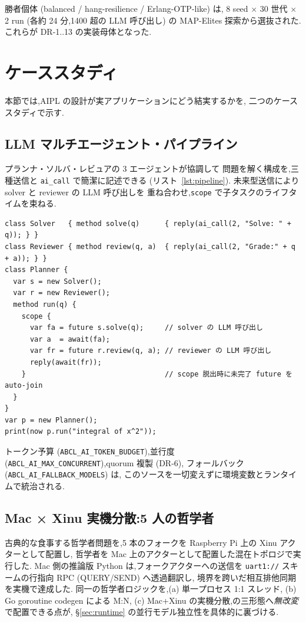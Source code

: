 \documentclass[11pt,a4paper]{article}
\newcommand{\code}[1]{\texttt{\small #1}}
\begin{document}
勝者個体 (balanced / hang-resilience / Erlang-OTP-like) は,
8 seed × 30 世代 × 2 run (各約 24 分,1400 超の LLM 呼び出し) の
MAP-Elites 探索から選抜された.
これらが DR-1..13 の実装母体となった.

\section{ケーススタディ}\label{sec:case}
本節では,AIPL の設計が実アプリケーションにどう結実するかを,
二つのケーススタディで示す.

\subsection{LLM マルチエージェント・パイプライン}
プランナ・ソルバ・レビュアの 3 エージェントが協調して
問題を解く構成を,三種送信と \code{ai\_call} で簡潔に記述できる
(リスト~\ref{lst:pipeline}).
未来型送信により solver と reviewer の LLM 呼び出しを
重ね合わせ,\code{scope} で子タスクのライフタイムを束ねる.

\begin{lstlisting}[caption={planner→solver→reviewer の協調},label={lst:pipeline},float=h]
class Solver   { method solve(q)      { reply(ai_call(2, "Solve: " + q)); } }
class Reviewer { method review(q, a)  { reply(ai_call(2, "Grade:" + q + a)); } }
class Planner {
  var s = new Solver();
  var r = new Reviewer();
  method run(q) {
    scope {
      var fa = future s.solve(q);     // solver の LLM 呼び出し
      var a  = await(fa);
      var fr = future r.review(q, a); // reviewer の LLM 呼び出し
      reply(await(fr));
    }                                 // scope 脱出時に未完了 future を auto-join
  }
}
var p = new Planner();
print(now p.run("integral of x^2"));
\end{lstlisting}

トークン予算 (\code{ABCL\_AI\_TOKEN\_BUDGET}),並行度
(\code{ABCL\_AI\_MAX\_CONCURRENT}),quorum 複製 (DR-6),
フォールバック (\code{ABCL\_AI\_FALLBACK\_MODELS}) は,
このソースを一切変えずに環境変数とランタイムで統治される.

\subsection{Mac × Xinu 実機分散:5 人の哲学者}
古典的な食事する哲学者問題を,5 本のフォークを
Raspberry Pi 上の Xinu アクターとして配置し,
哲学者を Mac 上のアクターとして配置した混在トポロジで実行した.
Mac 側の推論版 Python は,フォークアクターへの送信を
\code{uart1://} スキームの行指向 RPC (QUERY/SEND) へ透過翻訳し,
境界を跨いだ相互排他同期を実機で達成した.
同一の哲学者ロジックを,(a) 単一プロセス 1:1 スレッド,
(b) Go goroutine codegen による M:N,
(c) Mac+Xinu の実機分散,の三形態へ\emph{無改変}で配置できる点が,
\S\ref{sec:runtime} の並行モデル独立性を具体的に裏づける.
\end{document}
